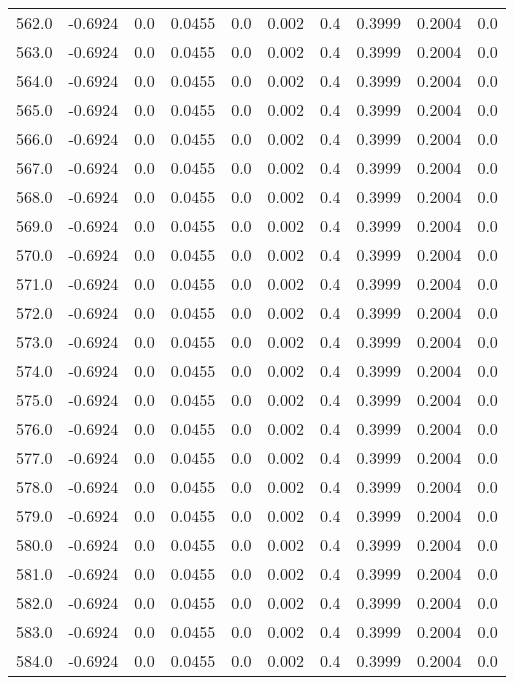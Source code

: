 \begin{longtable}{lrrrrrrrrr}
562.0 & -0.6924 & 0.0 & 0.0455 & 0.0 & 0.002 & 0.4 & 0.3999 & 0.2004 & 0.0 \\
563.0 & -0.6924 & 0.0 & 0.0455 & 0.0 & 0.002 & 0.4 & 0.3999 & 0.2004 & 0.0 \\
564.0 & -0.6924 & 0.0 & 0.0455 & 0.0 & 0.002 & 0.4 & 0.3999 & 0.2004 & 0.0 \\
565.0 & -0.6924 & 0.0 & 0.0455 & 0.0 & 0.002 & 0.4 & 0.3999 & 0.2004 & 0.0 \\
566.0 & -0.6924 & 0.0 & 0.0455 & 0.0 & 0.002 & 0.4 & 0.3999 & 0.2004 & 0.0 \\
567.0 & -0.6924 & 0.0 & 0.0455 & 0.0 & 0.002 & 0.4 & 0.3999 & 0.2004 & 0.0 \\
568.0 & -0.6924 & 0.0 & 0.0455 & 0.0 & 0.002 & 0.4 & 0.3999 & 0.2004 & 0.0 \\
569.0 & -0.6924 & 0.0 & 0.0455 & 0.0 & 0.002 & 0.4 & 0.3999 & 0.2004 & 0.0 \\
570.0 & -0.6924 & 0.0 & 0.0455 & 0.0 & 0.002 & 0.4 & 0.3999 & 0.2004 & 0.0 \\
571.0 & -0.6924 & 0.0 & 0.0455 & 0.0 & 0.002 & 0.4 & 0.3999 & 0.2004 & 0.0 \\
572.0 & -0.6924 & 0.0 & 0.0455 & 0.0 & 0.002 & 0.4 & 0.3999 & 0.2004 & 0.0 \\
573.0 & -0.6924 & 0.0 & 0.0455 & 0.0 & 0.002 & 0.4 & 0.3999 & 0.2004 & 0.0 \\
574.0 & -0.6924 & 0.0 & 0.0455 & 0.0 & 0.002 & 0.4 & 0.3999 & 0.2004 & 0.0 \\
575.0 & -0.6924 & 0.0 & 0.0455 & 0.0 & 0.002 & 0.4 & 0.3999 & 0.2004 & 0.0 \\
576.0 & -0.6924 & 0.0 & 0.0455 & 0.0 & 0.002 & 0.4 & 0.3999 & 0.2004 & 0.0 \\
577.0 & -0.6924 & 0.0 & 0.0455 & 0.0 & 0.002 & 0.4 & 0.3999 & 0.2004 & 0.0 \\
578.0 & -0.6924 & 0.0 & 0.0455 & 0.0 & 0.002 & 0.4 & 0.3999 & 0.2004 & 0.0 \\
579.0 & -0.6924 & 0.0 & 0.0455 & 0.0 & 0.002 & 0.4 & 0.3999 & 0.2004 & 0.0 \\
580.0 & -0.6924 & 0.0 & 0.0455 & 0.0 & 0.002 & 0.4 & 0.3999 & 0.2004 & 0.0 \\
581.0 & -0.6924 & 0.0 & 0.0455 & 0.0 & 0.002 & 0.4 & 0.3999 & 0.2004 & 0.0 \\
582.0 & -0.6924 & 0.0 & 0.0455 & 0.0 & 0.002 & 0.4 & 0.3999 & 0.2004 & 0.0 \\
583.0 & -0.6924 & 0.0 & 0.0455 & 0.0 & 0.002 & 0.4 & 0.3999 & 0.2004 & 0.0 \\
584.0 & -0.6924 & 0.0 & 0.0455 & 0.0 & 0.002 & 0.4 & 0.3999 & 0.2004 & 0.0 \\

\end{longtable}

